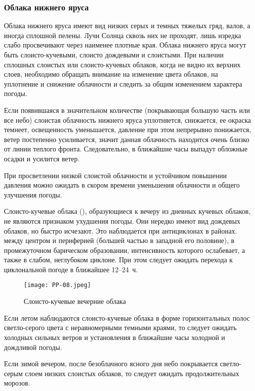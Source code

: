\subsubsection{Облака нижнего яруса}

Облака нижнего яруса имеют вид низких серых и темных тяжелых гряд,
валов, а иногда сплошной пелены. Лучи Солнца сквозь них не проходят,
лишь изредка слабо просвечивают через наименее плотные края. Облака
нижнего яруса могут быть слоисто-кучевыми, слоисто дождевыми и
слоистыми. При наличии сплошных слоистых или слоисто-кучевых облаков,
когда не видно их верхних слоев, необходимо обращать внимание на
изменение цвета облаков, на уплотнение и снижение облачности и следить
за общим изменением характера погоды.

 Если появившаяся в значительном количестве (покрывающая большую
часть или все небо) слоистая облачность нижнего яруса уплотняется,
снижается, ее окраска темнеет, освещенность уменьшается, давление при
этом непрерывно понижается, ветер постепенно усиливается, значит
данная облачность находится очень близко от линии теплого
фронта. Следовательно, в ближайшие часы выпадут обложные осадки и
усилится ветер.

 При просветлении низкой слоистой облачности и устойчивом
повышении давления можно ожидать в скором времени уменьшения
облачности и общего улучшения погоды.

 Слоисто-кучевые облака (), образующиеся к вечеру из
дневных кучевых облаков, не являются признаком ухудшения погоды. Они
нередко имеют вид дождевых облаков, но быстро исчезают. Это
наблюдается при антициклонах в районах. между центром и периферией
(большей частью в западной его половине), в промежуточном барическом
образовании, интенсивность которого ослабевает, а также в слабом,
неглубоком циклоне. При этом следует ожидать перехода к циклональной
погоде в ближайшее 12--24~ч.

\begin{figure}[htb]
  \centering{}
  \texttt{[image: PP-08.jpeg]}
  \caption{Слоисто-кучевые вечерние облака}
  \label{fig:pp08}
  \small
  \centering{}
\end{figure}

 Если летом наблюдаются слоисто-кучевые облака в форме
горизонтальных полос светло-серого цвета с неравномерными темными
краями, то следует ожидать холодных сильных ветров и установления в
ближайшие часы холодной и дождливой погоды.

 Если зимой вечером, после безоблачного ясного дня небо
покрывается светло-серым слоем низких слоистых облаков, то следует
ожидать продолжительных морозов.

